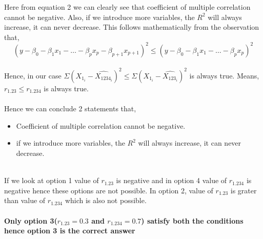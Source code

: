 \documentclass{article}
\begin{document}
Here from equation 2 we can clearly see that coefficient of multiple correlation cannot be negative. Also, if we introduce more variables, the \(R^2\) will always increase, it can never decrease. This follows mathematically from the observation that,\\
\begin{equation}
    (y - \beta_0 - \beta_1x_1 - \dots - \beta_px_p - \beta_{p+1}x_{p+1})^2 \leq (y - \beta_0 - \beta_1x_1 - \dots - \beta_px_p)^2
\end{equation} \\
Hence, in our case \(\Sigma(X_{1_i} - \hat{X_{1234_i}})^2 \leq \Sigma(X_{1_i} - \hat{X_{123_i}})^2\) is always true. Means, \(r_{1.23} \leq r_{1.234}\) is always true.   
\paragraph{}
Hence we can conclude 2 statements that, \begin{itemize}
    \item Coefficient of multiple correlation cannot be negative.
    \item if we introduce more variables, the \(R^2\) will always increase, it can never decrease.
\end{itemize}
\\
If we look at option 1 value of \(r_{1.23}\) is negative and in option 4 value of  \(r_{1.234}\) is negative hence these options are not possible. In option 2, value of \(r_{1.23}\) is grater than value of \(r_{1.234}\) which is also not possible.
\paragraph{}
\textbf{Only option 3(\(r_{1.23} = 0.3\) and \(r_{1.234} = 0.7\)) satisfy both the conditions hence option 3 is the correct answer}
\end{document}
